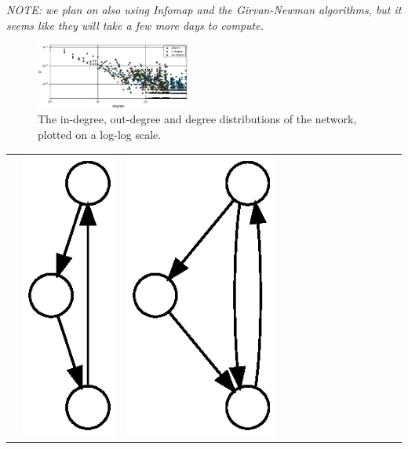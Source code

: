 \emph{NOTE: we plan on also using Infomap and the Girvan-Newman algorithms, but
  it seems like they will take a few more days to compute.}

\begin{figure}
  \includegraphics[width=0.45\textwidth]{../plots/degreesmall}
  \caption{The in-degree, out-degree and degree distributions of the network,
    plotted on a log-log scale.}
  \label{fig:dist}
\end{figure}

\begin{table}[t!]
  \centering
  \begin{tabular}{l|lllllllllllll}
    \hline\noalign{\smallskip}
    &
    \includegraphics[height=0.03\textheight]{M1-plain} &
    \includegraphics[height=0.03\textheight]{M2-plain} &

\end{tabular}
\end{table}
